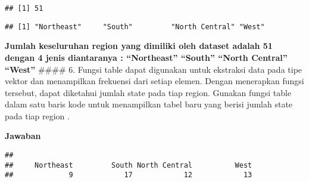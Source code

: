 \documentclass[
]{article}
\newenvironment{Shaded}{\begin{snugshade}}{\end{snugshade}}
\newcommand{\FunctionTok}[1]{\textcolor[rgb]{0.00,0.00,0.00}{#1}}
\newcommand{\NormalTok}[1]{#1}
\newcommand{\SpecialCharTok}[1]{\textcolor[rgb]{0.00,0.00,0.00}{#1}}
\begin{document}
\begin{verbatim}
## [1] 51
\end{verbatim}

\begin{Shaded}
\end{Shaded}

\begin{verbatim}
## [1] "Northeast"     "South"         "North Central" "West"
\end{verbatim}

\textbf{Jumlah keseluruhan region yang dimiliki oleh dataset adalah 51
dengan 4 jenis diantaranya : ``Northeast'' ``South'' ``North Central''
``West'' } \#\#\#\# 6. Fungsi table dapat digunakan untuk ekstraksi data
pada tipe vektor dan menampilkan frekuensi dari setiap elemen. Dengan
menerapkan fungsi tersebut, dapat diketahui jumlah state pada tiap
region. Gunakan fungsi table dalam satu baris kode untuk menampilkan
tabel baru yang berisi jumlah state pada tiap region .

\textbf{Jawaban}

\begin{Shaded}
\end{Shaded}

\begin{verbatim}
## 
##     Northeast         South North Central          West 
##             9            17            12            13
\end{verbatim}
\end{document}
